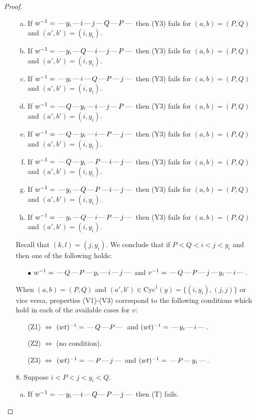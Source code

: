\documentclass[10pt]{article}
\theoremstyle{definition}
\theoremstyle{definition}
\def\dash{\text{\hspace{0.5mm}---\hspace{0.5mm}}}
\def\Cyc{\mathrm{Cyc}}
\begin{document}
\begin{proof}
\begin{enumerate}
\begin{enumerate}[(a)]
\item If $w^{-1} = \dash y_i\dash i\dash j\dash Q\dash P\dash $ then (Y3) fails for $(a,b)=(P,Q)$ and $(a',b')=(i,y_i)$.
\item If $w^{-1} = \dash y_i\dash Q\dash i\dash j\dash P\dash $ then (Y3) fails for $(a,b)=(P,Q)$ and $(a',b')=(i,y_i)$.
\item If $w^{-1} = \dash y_i\dash i\dash Q\dash P\dash j\dash $ then (Y3) fails for $(a,b)=(P,Q)$ and $(a',b')=(i,y_i)$.
\item If $w^{-1} = \dash Q\dash y_i\dash i\dash j\dash P\dash $ then (Y3) fails for $(a,b)=(P,Q)$ and $(a',b')=(i,y_i)$.
\item If $w^{-1} = \dash Q\dash y_i\dash i\dash P\dash j\dash $ then (Y3) fails for $(a,b)=(P,Q)$ and $(a',b')=(i,y_i)$.
\item If $w^{-1} = \dash Q\dash y_i\dash P\dash i\dash j\dash $ then (Y3) fails for $(a,b)=(P,Q)$ and $(a',b')=(i,y_i)$.
\item If $w^{-1} = \dash y_i\dash Q\dash P\dash i\dash j\dash $ then (Y3) fails for $(a,b)=(P,Q)$ and $(a',b')=(i,y_i)$.
\item If $w^{-1} = \dash y_i\dash Q\dash i\dash P\dash j\dash $ then (Y3) fails for $(a,b)=(P,Q)$ and $(a',b')=(i,y_i)$.
\end{enumerate}
Recall that $(k,l) = (j,y_i)$.
We conclude that if $P < Q < i < j < y_i$ and then one of the following holds:
\begin{enumerate}
\item[$\bullet$] $w^{-1} = \dash Q\dash P\dash y_i\dash i\dash j\dash $ and $v^{-1} = \dash Q\dash P\dash j\dash y_i\dash i\dash $.
\end{enumerate}
When $(a,b)= (P,Q)$ and $(a',b')\in \Cyc^1(y)=\{(i,y_i),(j,j)\}$ or vice versa,
properties (V1)-(V3) correspond to the following conditions which hold in
each of the available cases for $v$:
\begin{enumerate}
\item[](Z1) $\Leftrightarrow$ $(wt)^{-1} = \dash Q \dash P \dash$  and $(wt)^{-1} = \dash y_i \dash i \dash$.
\item[](Z2) $\Leftrightarrow$ (no condition).
\item[](Z3) $\Leftrightarrow$ $(wt)^{-1} = \dash P \dash j \dash$  and $(wt)^{-1} = \dash P \dash y_i \dash$.
\end{enumerate}
\item[$8$.] Suppose $i < P < j < y_i < Q$.
\begin{enumerate}[(a)]
\item If $w^{-1} = \dash y_i\dash i\dash Q\dash P\dash j\dash $ then (T) fails.

\end{enumerate}
\end{enumerate}
\end{proof}
\end{document}
